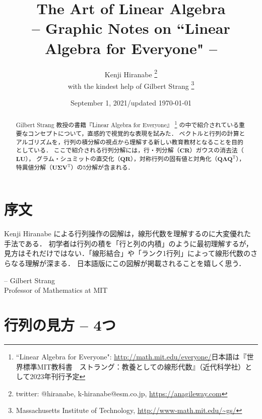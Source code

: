 \documentclass[letterpaper]{article}
\DeclareRobustCommand\transp{^{\mathrm{T}}}
\begin{document}
\title{The Art of Linear Algebra\\
\vspace{5pt}
\large{
-- Graphic Notes on ``Linear Algebra for Everyone" --
}
}

\author{Kenji Hiranabe
\thanks{twitter: @hiranabe, k-hiranabe@esm.co.jp, \url{https://anagileway.com}} \\
with the kindest help of Gilbert Strang
\thanks{Massachusetts Institute of Technology, \url{http://www-math.mit.edu/\~gs/}}
}

\date{September 1, 2021/updated \today}

\maketitle

\vspace{-5pt}
 
\begin{abstract}
Gilbert Strang 教授の書籍『Linear Algebra for Everyone』
\footnote{``Linear Algebra for Everyone":
\url{http://math.mit.edu/everyone/}日本語は『世界標準MIT教科書　ストラング：教養としての線形代数』（近代科学社）として2023年刊行予定}
の中で紹介されている重要なコンセプトについて，直感的で視覚的な表現を試みた．
ベクトルと行列の計算とアルゴリズムを，行列の積分解の視点から理解する新しい教育教材となることを目的としている．
ここで紹介される行列分解には，行・列分解（$\bm{CR}$）ガウスの消去法（$\bm{LU}$），
グラム・シュミットの直交化（$\bm{QR}$），対称行列の固有値と対角化（$\bm{Q \Lambda Q\transp}$），
特異値分解（$\bm{U \Sigma V\transp}$）の5分解が含まれる．
\end{abstract}

\section*{序文}
Kenji Hiranabe による行列操作の図解は，線形代数を理解するのに大変優れた手法である．
初学者は行列の積を「行と列の内積」のように最初理解するが，
見方はそれだけではない．「線形結合」や「ランク1行列」によって線形代数のさらなる理解が深まる．
日本語版にこの図解が掲載されることを嬉しく思う．
\begin{flushright}
-- Gilbert Strang \\ Professor of Mathematics at MIT
\end{flushright}

\tableofcontents

\section{行列の見方 -- 4つ}
\end{document}
